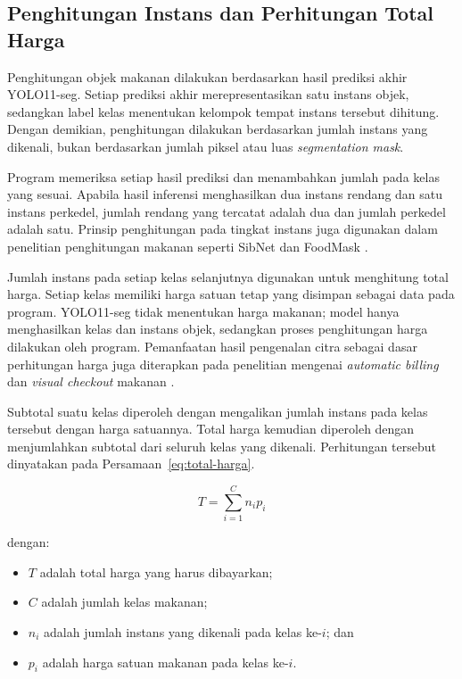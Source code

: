 \subsection{Penghitungan Instans dan Perhitungan Total Harga}

Penghitungan objek makanan dilakukan berdasarkan hasil prediksi akhir YOLO11-seg. Setiap prediksi akhir merepresentasikan satu instans objek, sedangkan label kelas menentukan kelompok tempat instans tersebut dihitung. Dengan demikian, penghitungan dilakukan berdasarkan jumlah instans yang dikenali, bukan berdasarkan jumlah piksel atau luas \textit{segmentation mask}.

Program memeriksa setiap hasil prediksi dan menambahkan jumlah pada kelas yang sesuai. Apabila hasil inferensi menghasilkan dua instans rendang dan satu instans perkedel, jumlah rendang yang tercatat adalah dua dan jumlah perkedel adalah satu. Prinsip penghitungan pada tingkat instans juga digunakan dalam penelitian penghitungan makanan seperti SibNet dan FoodMask \cite{nguyen2022sibnet,nguyen2023foodmask}.

Jumlah instans pada setiap kelas selanjutnya digunakan untuk menghitung total harga. Setiap kelas memiliki harga satuan tetap yang disimpan sebagai data pada program. YOLO11-seg tidak menentukan harga makanan; model hanya menghasilkan kelas dan instans objek, sedangkan proses penghitungan harga dilakukan oleh program. Pemanfaatan hasil pengenalan citra sebagai dasar perhitungan harga juga diterapkan pada penelitian mengenai \textit{automatic billing} dan \textit{visual checkout} makanan \cite{wu2021,guo2023}.

Subtotal suatu kelas diperoleh dengan mengalikan jumlah instans pada kelas tersebut dengan harga satuannya. Total harga kemudian diperoleh dengan menjumlahkan subtotal dari seluruh kelas yang dikenali. Perhitungan tersebut dinyatakan pada Persamaan~\ref{eq:total-harga}.

\begin{equation}
    T = \sum_{i=1}^{C} n_i p_i
    \label{eq:total-harga}
\end{equation}

dengan:
\begin{itemize}
    \item $T$ adalah total harga yang harus dibayarkan;
    \item $C$ adalah jumlah kelas makanan;
    \item $n_i$ adalah jumlah instans yang dikenali pada kelas ke-$i$; dan
    \item $p_i$ adalah harga satuan makanan pada kelas ke-$i$.
\end{itemize}

